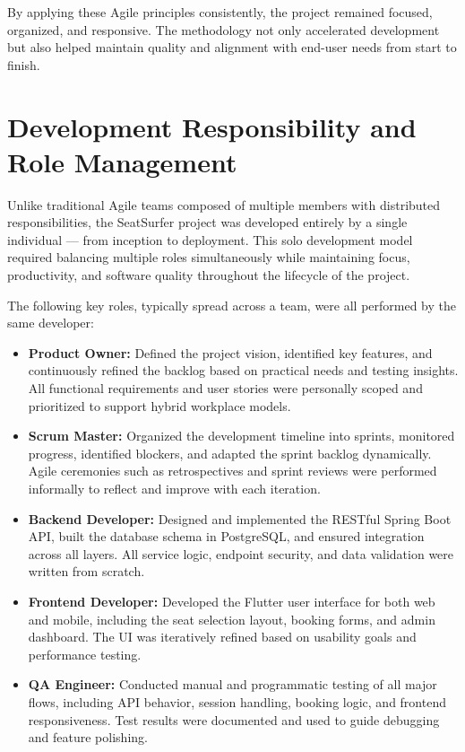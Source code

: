 \documentclass[12pt,a4paper]{report} %
\begin{document}
By applying these Agile principles consistently, the project remained focused, organized, and responsive. The methodology not only accelerated development but also helped maintain quality and alignment with end-user needs from start to finish.

\section{Development Responsibility and Role Management}

Unlike traditional Agile teams composed of multiple members with distributed responsibilities, the SeatSurfer project was developed entirely by a single individual — from inception to deployment. This solo development model required balancing multiple roles simultaneously while maintaining focus, productivity, and software quality throughout the lifecycle of the project.

The following key roles, typically spread across a team, were all performed by the same developer:

\begin{itemize}
\item \textbf{Product Owner:}
Defined the project vision, identified key features, and continuously refined the backlog based on practical needs and testing insights. All functional requirements and user stories were personally scoped and prioritized to support hybrid workplace models.
\item \textbf{Scrum Master:}  
Organized the development timeline into sprints, monitored progress, identified blockers, and adapted the sprint backlog dynamically. Agile ceremonies such as retrospectives and sprint reviews were performed informally to reflect and improve with each iteration.

\item \textbf{Backend Developer:}  
Designed and implemented the RESTful Spring Boot API, built the database schema in PostgreSQL, and ensured integration across all layers. All service logic, endpoint security, and data validation were written from scratch.

\item \textbf{Frontend Developer:}  
Developed the Flutter user interface for both web and mobile, including the seat selection layout, booking forms, and admin dashboard. The UI was iteratively refined based on usability goals and performance testing.

\item \textbf{QA Engineer:}  
Conducted manual and programmatic testing of all major flows, including API behavior, session handling, booking logic, and frontend responsiveness. Test results were documented and used to guide debugging and feature polishing.
\end{itemize}
\end{document}
